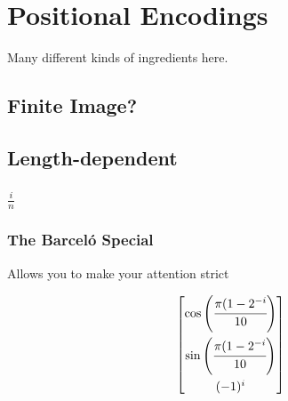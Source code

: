 %
\chapter{Positional Encodings}
%

Many different kinds of ingredients here.

\section{Finite Image?}

\section{Length-dependent}

\subsection{$\frac{i}{n}$}

\subsection{The Barceló Special}

Allows you to make your attention strict 

\[\begin{bmatrix}
    \cos\left(\cfrac{\pi(1-2^{-i}}{10}\right)\\[3ex]
    \sin\left(\cfrac{\pi(1-2^{-i}}{10}\right)\\[3ex]
    (-1)^i
\end{bmatrix}\]